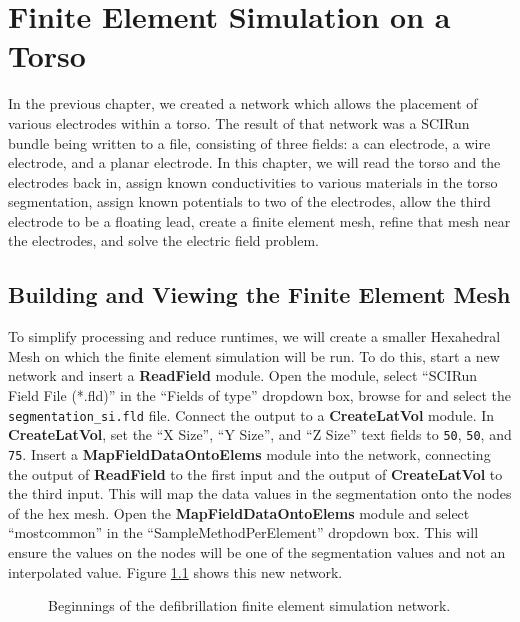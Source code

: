 \documentclass[fleqn,11pt,openany]{book}
\begin{document}
\chapter{Finite Element Simulation on a Torso}

In the previous chapter, we created a network which allows the
placement of various electrodes within a torso. The result of that
network was a SCIRun bundle being written to a file, consisting of
three fields: a can electrode, a wire electrode, and a planar
electrode. In this chapter, we will read the torso and the electrodes
back in, assign known conductivities to various materials in the torso
segmentation, assign known potentials to two of the electrodes, allow
the third electrode to be a floating lead, create a finite element
mesh, refine that mesh near the electrodes, and solve the electric
field problem.

\section{Building and Viewing the Finite Element Mesh}

To simplify processing and reduce runtimes, we will create a smaller
Hexahedral Mesh on which the finite element simulation will be run. To
do this, start a new network and insert a {\bf ReadField} module. Open
the module, select ``SCIRun Field File (*.fld)'' in the ``Fields of
type'' dropdown box, browse for and select the {\tt
segmentation\_si.fld} file. Connect the output to a {\bf CreateLatVol}
module. In {\bf CreateLatVol}, set the ``X Size'', ``Y Size'', and ``Z
Size'' text fields to {\tt 50}, {\tt 50}, and {\tt 75}. Insert a {\bf
MapFieldDataOntoElems} module into the network, connecting the output
of {\bf ReadField} to the first input and the output of {\bf
CreateLatVol} to the third input. This will map the data values in the
segmentation onto the nodes of the hex mesh. Open the {\bf
MapFieldDataOntoElems} module and select ``mostcommon'' in the
``SampleMethodPerElement'' dropdown box. This will ensure the values
on the nodes will be one of the segmentation values and not an
interpolated value. Figure \ref{fig:defib_fem_nw_01} shows this new
network.

\begin{figure}
\caption{Beginnings of the defibrillation finite element simulation
network.}\label{fig:defib_fem_nw_01}
\end{figure}
\end{document}

